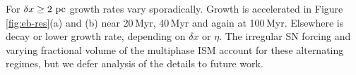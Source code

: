 \documentclass[preprint2]{aastex63}
\newcommand\pc{~ {\rm pc}}
\newcommand\dx{ {\delta x}}
\begin{document}
%
 For $\dx\geq2\pc$ growth rates vary sporadically.
 Growth is accelerated in Figure\,\ref{fig:eb-res}(a) and (b) near 20\,Myr,
 40\,Myr and again at 100\,Myr.
 Elsewhere is decay or lower growth rate, depending on $\dx$ or $\eta$.
 The irregular SN forcing and varying fractional volume of the multiphase ISM
 account for these alternating regimes, but we defer analysis of the details
 to future work.
 
%
\end{document}
